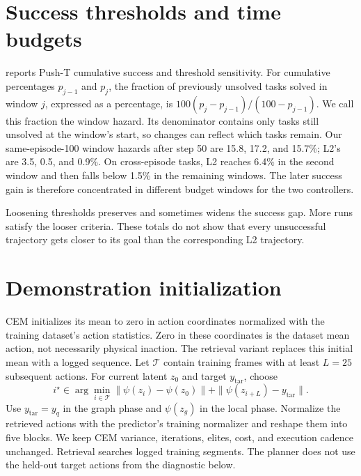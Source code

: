 \documentclass{article}
\theoremstyle{definition}
\theoremstyle{remark}
\begin{document}
\section{Success thresholds and time budgets}
\label{app:diagnostics}
 reports Push-T cumulative success and threshold sensitivity.
For cumulative percentages $p_{j-1}$ and $p_j$, the fraction of previously unsolved
tasks solved in window $j$, expressed as a percentage, is
$100(p_j-p_{j-1})/(100-p_{j-1})$.
We call this fraction the window hazard. Its denominator contains only tasks still
unsolved at the window's start, so changes can reflect which tasks remain.
Our same-episode-100 window hazards after step 50 are 15.8, 17.2, and 15.7\%;
L2's are 3.5, 0.5, and 0.9\%. On cross-episode tasks, L2 reaches 6.4\%
in the second window and then falls below 1.5\% in the remaining windows.
The later success gain is therefore concentrated in different budget windows for
the two controllers.

Loosening thresholds preserves and sometimes widens the success gap.
More runs satisfy the looser criteria. These totals do not show that every unsuccessful
trajectory gets closer to its goal than the corresponding L2 trajectory.

\section{Demonstration initialization}
\label{app:retrieval}
CEM initializes its mean to zero in action coordinates normalized with the training
dataset's action statistics. Zero in these coordinates is the dataset mean action,
not necessarily physical inaction.
The retrieval variant replaces this initial mean with a logged sequence.
Let $\mathcal T$ contain training frames with at least $L=25$ subsequent actions.
For current latent $z_0$ and target $y_{\mathrm{tar}}$, choose
\begin{equation}
 i^\star\in\arg\min_{i\in\mathcal T}
    \|\psi(z_i)-\psi(z_0)\|
       +\|\psi(z_{i+L})-y_{\mathrm{tar}}\|.
 \label{eq:retrieval}
\end{equation}
Use $y_{\mathrm{tar}}=y_q$ in the graph phase and $\psi(z_g)$ in the local phase.
Normalize the retrieved actions with the predictor's training normalizer and reshape
them into five blocks. We keep CEM variance, iterations, elites, cost, and execution
cadence unchanged. Retrieval searches logged training segments. The planner does not
use the held-out target actions from the diagnostic below.
\end{document}
